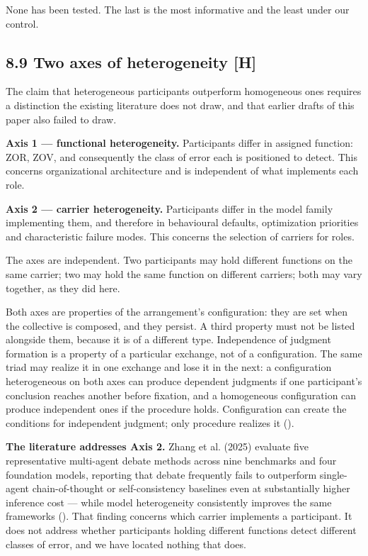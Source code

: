 None has been tested. The last is the most informative and the least under our control.


\subsection*{8.9 Two axes of heterogeneity \textbf{[H]}}
\label{sec:en:8.9}

The claim that heterogeneous participants outperform homogeneous ones requires a distinction the existing literature does not draw, and that earlier drafts of this paper also failed to draw.

\textbf{Axis 1 — functional heterogeneity.} Participants differ in assigned function: ZOR, ZOV, and consequently the class of error each is positioned to detect. This concerns organizational architecture and is independent of what implements each role.

\textbf{Axis 2 — carrier heterogeneity.} Participants differ in the model family implementing them, and therefore in behavioural defaults, optimization priorities and characteristic failure modes. This concerns the selection of carriers for roles.

The axes are independent. Two participants may hold different functions on the same carrier; two may hold the same function on different carriers; both may vary together, as they did here.

Both axes are properties of the arrangement's configuration: they are set when the collective is composed, and they persist. A third property must not be listed alongside them, because it is of a different type. Independence of judgment formation is a property of a particular exchange, not of a configuration. The same triad may realize it in one exchange and lose it in the next: a configuration heterogeneous on both axes can produce dependent judgments if one participant's conclusion reaches another before fixation, and a homogeneous configuration can produce independent ones if the procedure holds. Configuration can create the conditions for independent judgment; only procedure realizes it ().

\textbf{The literature addresses Axis 2.} Zhang et al. (2025) evaluate five representative multi-agent debate methods across nine benchmarks and four foundation models, reporting that debate frequently fails to outperform single-agent chain-of-thought or self-consistency baselines even at substantially higher inference cost — while model heterogeneity consistently improves the same frameworks (). That finding concerns which carrier implements a participant. It does not address whether participants holding different functions detect different classes of error, and we have located nothing that does.
\nocite{zhang2025overvaluing}

